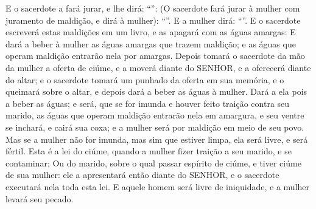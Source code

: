 {{  E o sacerdote a fará jurar, e lhe dirá: \enquote{}:
  (O sacerdote fará jurar à mulher com juramento de maldição, e dirá à mulher): \enquote{}. E a mulher dirá: \enquote{}.
  E o sacerdote escreverá estas maldições em um livro, e as apagará com as águas amargas:
  E dará a beber à mulher as águas amargas que trazem maldição; e as águas que operam maldição entrarão nela por amargas.
  Depois tomará o sacerdote da mão da mulher a oferta de ciúme, e a moverá diante do SENHOR, e a oferecerá diante do altar;
  e o sacerdote tomará um punhado da oferta em sua memória, e o queimará sobre o altar, e depois dará a beber as águas à mulher.
  Dará a ela pois a beber as águas; e será, que se for imunda e houver feito traição contra seu marido, as águas que operam maldição entrarão nela em amargura, e seu ventre se inchará, e cairá sua coxa; e a mulher será por maldição em meio de seu povo.
  Mas se a mulher não for imunda, mas sim que estiver limpa, ela será livre, e será fértil.
  Esta é a lei do ciúme, quando a mulher fizer traição a seu marido, e se contaminar;
  Ou do marido, sobre o qual passar espírito de ciúme, e tiver ciúme de sua mulher: ele a apresentará então diante do SENHOR, e o sacerdote executará nela toda esta lei.
  E aquele homem será livre de iniquidade, e a mulher levará seu pecado}.
\par }

